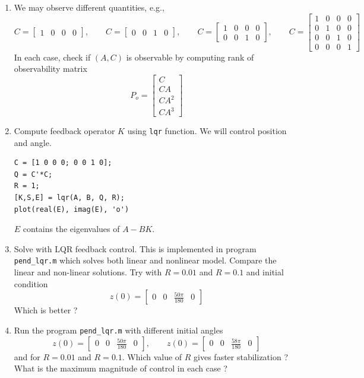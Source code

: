 \documentclass[12pt]{article}
\begin{document}
\begin{enumerate}

\item We may observe different quantities, e.g.,
\[
C = \begin{bmatrix}
1 & 0 & 0 & 0 
\end{bmatrix}, \qquad C = \begin{bmatrix}
0 & 0 & 1 & 0
\end{bmatrix}, \qquad C = \begin{bmatrix}
1 & 0 & 0 & 0 \\
0 & 0 & 1 & 0
\end{bmatrix}, \qquad C = \begin{bmatrix}
1 & 0 & 0 & 0 \\
0 & 1 & 0 & 0 \\
0 & 0 & 1 & 0 \\
0 & 0 & 0 & 1
\end{bmatrix}
\]
In each case, check if $(A,C)$ is observable by computing rank of observability matrix
\[
P_o = \begin{bmatrix}
C \\
CA \\
CA^2 \\
CA^3
\end{bmatrix}
\]

\item Compute feedback operator $K$ using {\tt lqr} function. We will control position and angle.
\begin{lstlisting}
C = [1 0 0 0; 0 0 1 0];
Q = C'*C;
R = 1;
[K,S,E] = lqr(A, B, Q, R);
plot(real(E), imag(E), 'o')
\end{lstlisting}
$E$ contains the eigenvalues of $A - B K$.

\item Solve with LQR feedback control. This is implemented in program {\tt pend\_lqr.m} which solves both linear and nonlinear model. Compare the linear and non-linear solutions. Try with $R=0.01$ and $R=0.1$ and initial condition
\[
z(0) = \begin{bmatrix}
0 & 0 & \frac{50 \pi}{180} & 0 
\end{bmatrix}
\]
Which is better ?

\item Run the program {\tt pend\_lqr.m} with different initial angles
\[
z(0) = \begin{bmatrix}
0 & 0 & \frac{50 \pi}{180} & 0 
\end{bmatrix}, \qquad z(0) = \begin{bmatrix}
0 & 0 & \frac{58 \pi}{180} & 0 
\end{bmatrix}
\]
and for $R=0.01$ and $R=0.1$. Which value of $R$ gives faster stabilization ? What is the maximum magnitude of control in each case ? 


\end{enumerate}
\end{document}
